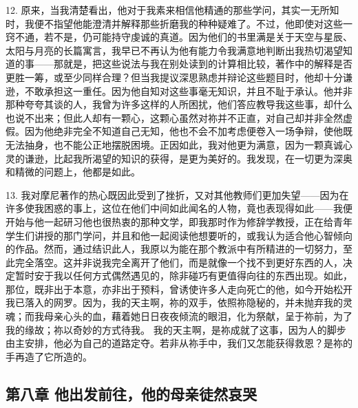 12. 原来，当我清楚看出，他对于我素来相信他精通的那些学问，其实一无所知时，我便不指望他能澄清并解释那些折磨我的种种疑难了。不过，他即使对这些一窍不通，若不是，仍可能持守虔诚的真道。因为他们的书里满是关于天空与星辰、太阳与月亮的长篇寓言，我早已不再认为他有能力令我满意地判断出我热切渴望知道的事——那就是，把这些说法与我在别处读到的计算相比较，著作中的解释是否更胜一筹，或至少同样合理？但当我提议深思熟虑并辩论这些题目时，他却十分谦逊，不敢承担这一重任。因为他自知对这些事毫无知识，并且不耻于承认。他并非那种夸夸其谈的人，我曾为许多这样的人所困扰，他们答应教导我这些事，却什么也说不出来；但此人却有一颗心，这颗心虽然对祢并不正直，对自己却并非全然虚假。因为他绝非完全不知道自己无知，他也不会不加考虑便卷入一场争辩，使他既无法抽身，也不能公正地摆脱困境。正因如此，我对他更为满意，因为一颗真诚心灵的谦逊，比起我所渴望的知识的获得，是更为美好的。我发现，在一切更为深奥和精微的问题上，他都是如此。\par

13. 我对摩尼著作的热心既因此受到了挫折，又对其他教师们更加失望——因为在许多使我困惑的事上，这位在他们中间如此闻名的人物，竟也表现得如此——我便开始与他一起研习他也很热衷的那种文学，即我那时作为修辞学教授，正在给青年学生们讲授的那门学问，并且和他一起阅读他想要听的，或我认为适合他心智倾向的作品。然而，通过结识此人，我原以为能在那个教派中有所精进的一切努力，至此完全落空。这并非说我完全离开了他们，而是就像一个找不到更好东西的人，决定暂时安于我以任何方式偶然遇见的，除非碰巧有更值得向往的东西出现。如此，那位，既非出于本意，亦非出于预料，曾诱使许多人走向死亡的他，如今开始松开我已落入的网罗。因为，我的天主啊，祢的双手，依照祢隐秘的，并未抛弃我的灵魂；而我母亲心头的血，藉着她日日夜夜倾流的眼泪，化为祭献，呈于祢前，为了我的缘故；祢以奇妙的方式待我。 我的天主啊，是祢成就了这事，因为人的脚步由主安排，他必为自己的道路定夺。若非从祢手中，我们又怎能获得救恩？是祢的手再造了它所造的。\par


\subsection{第八章 他出发前往，他的母亲徒然哀哭}

